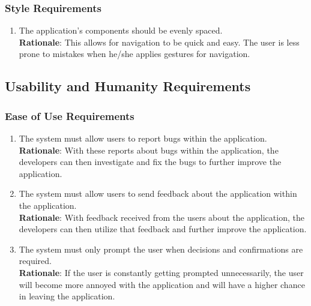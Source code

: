 \subsubsection{Style Requirements}
\label{ssub:style_requirements}
\begin{enumerate}[{LF-S}1. ]
	\item The application’s components should be evenly spaced.
	\\ \textbf{Rationale}: This allows for navigation to be quick and easy. The user is less prone to mistakes when he/she applies gestures for navigation.
\end{enumerate}



\subsection{Usability and Humanity Requirements}
\label{sub:usability_and_humanity_requirements}

\subsubsection{Ease of Use Requirements}
\label{ssub:ease_of_use_requirements}
\begin{enumerate}[{UH-EOU}1. ]
	\item The system must allow users to report bugs within the application.\\ \textbf{Rationale}: With these reports about bugs within the application, the developers can then investigate and fix the bugs to further improve the application.
	\item The system must allow users to send feedback about the application within the application.\\ \textbf{Rationale}: With feedback received from the users about the application, the developers can then utilize that feedback and further improve the application.
	\item The system must only prompt the user when decisions and confirmations are required.\\ \textbf{Rationale}: If the user is constantly getting prompted unnecessarily, the user will become more annoyed with the application and will have a higher chance in leaving the application.
\end{enumerate}


